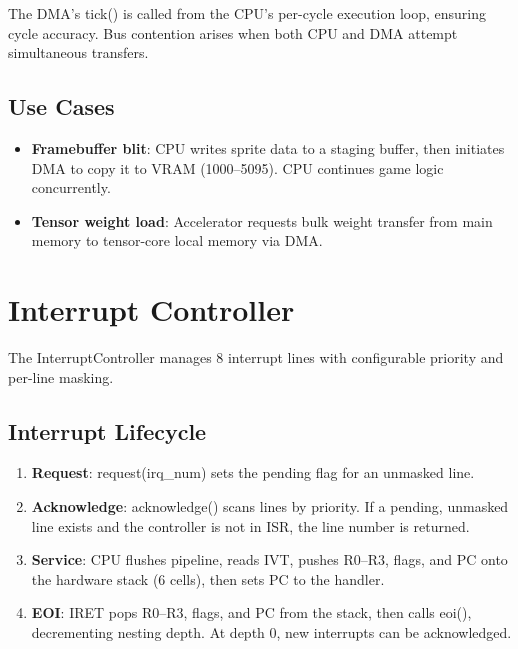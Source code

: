 \documentclass[12pt,a4paper,twoside]{book}
\theoremstyle{trinarytheorem}
\theoremstyle{trinarydefinition}
\newcommand{\code}[1]{\textsf{#1}}
\begin{document}
The DMA's \code{tick()} is called from the CPU's per-cycle execution
loop, ensuring cycle accuracy. Bus contention arises when both CPU
and DMA attempt simultaneous transfers.

\subsection{Use Cases}

\begin{itemize}
    \item \textbf{Framebuffer blit}: CPU writes sprite data to a staging
          buffer, then initiates DMA to copy it to VRAM (1000--5095).
          CPU continues game logic concurrently.
    \item \textbf{Tensor weight load}: Accelerator requests bulk weight
          transfer from main memory to tensor-core local memory via DMA.
\end{itemize}

\section{Interrupt Controller}

The \code{InterruptController} manages 8 interrupt lines with
configurable priority and per-line masking.

\subsection{Interrupt Lifecycle}

\begin{enumerate}
    \item \textbf{Request}: \code{request(irq\_num)} sets the pending
          flag for an unmasked line.
    \item \textbf{Acknowledge}: \code{acknowledge()} scans lines by
          priority. If a pending, unmasked line exists and the controller
          is not in ISR, the line number is returned.
    \item \textbf{Service}: CPU flushes pipeline, reads IVT, pushes
          R0--R3, flags, and PC onto the hardware stack (6 cells),
          then sets PC to the handler.
    \item \textbf{EOI}: \code{IRET} pops R0--R3, flags, and PC from the
          stack, then calls \code{eoi()}, decrementing nesting depth.
          At depth 0, new interrupts can be acknowledged.
\end{enumerate}
\end{document}
